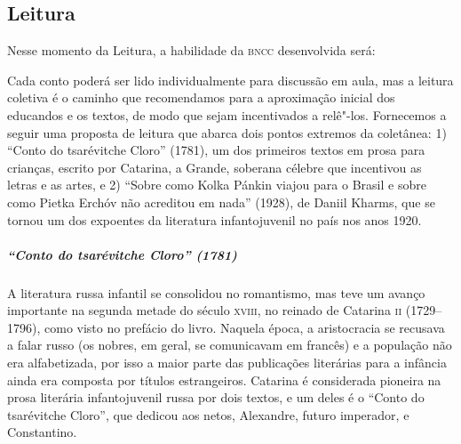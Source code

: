 \documentclass[11pt]{extarticle}
\begin{document}
\subsection{Leitura}

Nesse momento da Leitura, a habilidade da \textsc{bncc} desenvolvida será:

Cada conto poderá ser lido individualmente para discussão em aula, mas a
leitura coletiva é o caminho que recomendamos para a aproximação inicial
dos educandos e os textos, de modo que sejam incentivados a relê"-los.
Fornecemos a seguir uma proposta de leitura que abarca dois pontos
extremos da coletânea: 1) ``Conto do tsarévitche Cloro'' (1781), um dos
primeiros textos em prosa para crianças, escrito por Catarina, a Grande,
soberana célebre que incentivou as letras e as artes, e 2) ``Sobre como
Kolka Pánkin viajou para o Brasil e sobre como Pietka Erchóv não
acreditou em nada'' (1928), de Daniil Kharms, que se tornou um dos
expoentes da literatura infantojuvenil no país nos anos 1920.


\subparagraph{``Conto do tsarévitche Cloro'' (1781)}


\reversemarginpar
\marginparwidth=5cm


A literatura russa infantil se consolidou no romantismo, mas teve um
avanço importante na segunda metade do século \textsc{xviii}, no reinado de
Catarina \textsc{ii} (1729--1796), como visto no prefácio do livro. Naquela
época, a aristocracia se recusava a falar russo (os nobres, em geral, se
comunicavam em francês) e a população não era alfabetizada, por isso a
maior parte das publicações literárias para a infância ainda era
composta por títulos estrangeiros. Catarina é considerada pioneira na
prosa literária infantojuvenil russa por dois textos, e um deles é o
``Conto do tsarévitche Cloro'', que dedicou aos netos, Alexandre, futuro
imperador, e Constantino.

\end{document}
